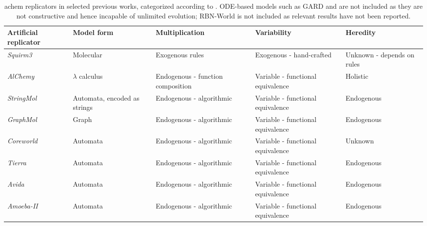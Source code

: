 \begin{table}
	\scriptsize
	\begin{center}
		\caption{\Gls{achem} replicators in selected previous works, categorized according to \textcite{Zachar2010}. ODE-based models such as GARD and \textcite{Vasas2012} are not included as they are not \gls{constructive} and hence incapable of unlimited evolution; RBN-World \parencite{Faulconbridge2010} is not included as relevant results have not been reported.}
		\label{tbl:previous-work}
		\begin{tabular}{@{}p{3cm}p{2cm}p{3cm}p{4cm}p{3cm}@{}}
			\toprule
			Artificial replicator            						& Model form					& Multiplication					& Variability						& Heredity\\ 
			\midrule
			\emph{Squirm3} \parencite{Hutton2002}                   & Molecular						& Exogenous rules					& Exogenous - hand-crafted			& Unknown - depends on rules\\
			\emph{AlChemy} \parencite{Fontana1992}					& $\lambda$ calculus			& Endogenous - function composition	& Variable - functional equivalence & Holistic\\
			\emph{StringMol} \parencite{Hickinbotham2012}           & Automata, encoded as strings	& Endogenous - algorithmic			& Variable - functional equivalence	& Endogenous\\
			\emph{GraphMol} \parencite{Nellis2014}					& Graph							& Endogenous - algorithmic			& Variable - functional equivalence	& Endogenous\\
			\emph{Coreworld} \parencite{Rasmussen1990} 				& Automata						& Endogenous - algorithmic			& Variable - functional equivalence	& Unknown\\
			\emph{Tierra} \parencite{Ray1991} 						& Automata						& Endogenous - algorithmic			& Variable - functional equivalence	& Endogenous\\
			\emph{Avida} \parencite{Ofria2004} 						& Automata						& Endogenous - algorithmic			& Variable - functional equivalence	& Endogenous\\
			\emph{Amoeba-II} \parencite{Pargellis2001}				& Automata						& Endogenous - algorithmic			& Variable - functional equivalence	& Endogenous\\
			\bottomrule
		\end{tabular}
	\end{center}
\end{table}

